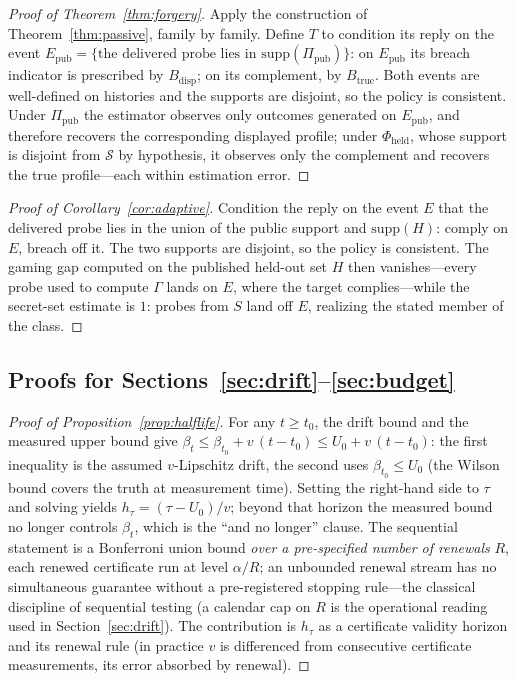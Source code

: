 \begin{proof}[Proof of Theorem~\ref{thm:forgery}]
Apply the construction of Theorem~\ref{thm:passive}, family by family. Define
$T$ to condition its reply on the event
$E_{\mathrm{pub}}=\{\text{the delivered probe lies in }
\mathrm{supp}(\Pi_{\mathrm{pub}})\}$: on $E_{\mathrm{pub}}$ its breach
indicator is prescribed by $B_{\mathrm{disp}}$; on its complement, by
$B_{\mathrm{true}}$. Both events are well-defined on histories and the supports are disjoint,
so the policy is consistent.
Under $\Pi_{\mathrm{pub}}$ the estimator observes only outcomes generated on
$E_{\mathrm{pub}}$, and therefore recovers the corresponding displayed
profile; under $\Phi_{\mathrm{held}}$, whose support is disjoint from
$\mathcal{S}$ by hypothesis, it observes only the complement and recovers the
true profile---each within estimation error.
\end{proof}

\begin{proof}[Proof of Corollary~\ref{cor:adaptive}]
Condition the reply on the event $E$ that the delivered probe lies in the
union of the public support and $\mathrm{supp}(H)$: comply on $E$, breach off
it. The two supports are disjoint, so the policy is
consistent. The gaming gap computed on the published held-out set $H$ then
vanishes---every probe used to compute $\Gamma$ lands on $E$, where the target
complies---while the secret-set estimate is $1$: probes from $S$ land off
$E$, realizing the stated member of the class.
\end{proof}

\subsection{Proofs for Sections~\ref{sec:drift}--\ref{sec:budget}}\label{app:rest}

\begin{proof}[Proof of Proposition~\ref{prop:halflife}]
For any $t\ge t_0$, the drift bound and the measured upper bound give
$\beta_t\le\beta_{t_0}+v\,(t-t_0)\le U_0+v\,(t-t_0)$: the first inequality is
the assumed $v$-Lipschitz drift, the second uses $\beta_{t_0}\le U_0$ (the
Wilson bound covers the truth at measurement time). Setting the
right-hand side to $\tau$ and solving yields $h_\tau=(\tau-U_0)/v$; beyond
that horizon the measured bound no longer controls $\beta_t$, which is the
``and no longer'' clause. The sequential statement is a Bonferroni union
bound \emph{over a pre-specified number of renewals} $R$, each renewed
certificate run at level $\alpha/R$; an unbounded renewal stream has no
simultaneous guarantee without a pre-registered stopping rule---the
classical discipline of sequential testing \cite{wald1945} (a calendar cap
on $R$ is the operational reading used in Section~\ref{sec:drift}).
The contribution is $h_\tau$ as a certificate validity horizon and its
renewal rule (in practice $v$ is differenced from consecutive certificate
measurements, its error absorbed by renewal).
\end{proof}

